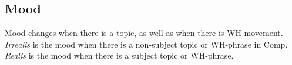 \documentclass[12pt]{article}
\begin{document}
{\small
{}
}

\subsection{Mood}

Mood changes when there is a topic, as well as when
there is WH-movement.  \emph{Irrealis} is the mood when
there is a non-subject topic or WH-phrase in Comp.
\emph{Realis} is the mood when there is a subject topic
or WH-phrase.
\end{document}
